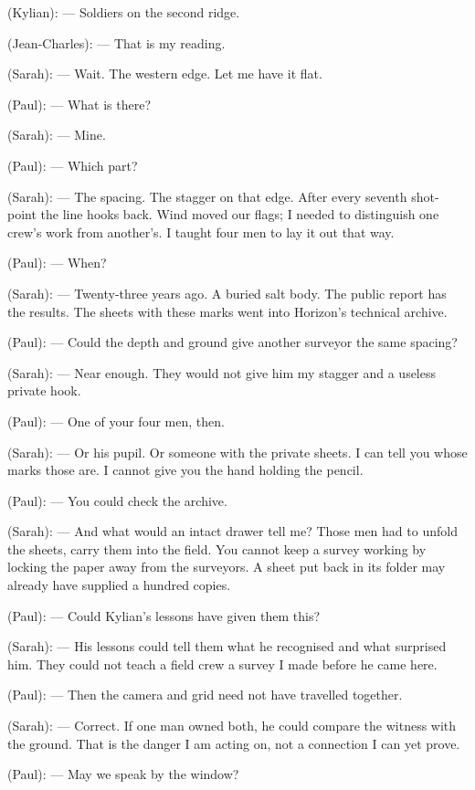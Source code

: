 \begin{room}
(Kylian): --- Soldiers on the second ridge.

(Jean-Charles): --- That is my reading.

(Sarah): --- Wait. The western edge. Let me have it flat.

(Paul): --- What is there?

(Sarah): --- Mine.

\centerline{}

(Paul): --- Which part?

(Sarah): --- The spacing. The stagger on that edge. After every seventh shot-point the line hooks back. Wind moved our flags; I needed to distinguish one crew's work from another's. I taught four men to lay it out that way.

(Paul): --- When?

(Sarah): --- Twenty-three years ago. A buried salt body. The public report has the results. The sheets with these marks went into Horizon's technical archive.

(Paul): --- Could the depth and ground give another surveyor the same spacing?

(Sarah): --- Near enough. They would not give him my stagger and a useless private hook.

(Paul): --- One of your four men, then.

(Sarah): --- Or his pupil. Or someone with the private sheets. I can tell you whose marks those are. I cannot give you the hand holding the pencil.

(Paul): --- You could check the archive.

(Sarah): --- And what would an intact drawer tell me? Those men had to unfold the sheets, carry them into the field. You cannot keep a survey working by locking the paper away from the surveyors. A sheet put back in its folder may already have supplied a hundred copies.

(Paul): --- Could Kylian's lessons have given them this?

(Sarah): --- His lessons could tell them what he recognised and what surprised him. They could not teach a field crew a survey I made before he came here.

(Paul): --- Then the camera and grid need not have travelled together.

(Sarah): --- Correct. If one man owned both, he could compare the witness with the ground. That is the danger I am acting on, not a connection I can yet prove.

(Paul): --- May we speak by the window?


\end{room}
